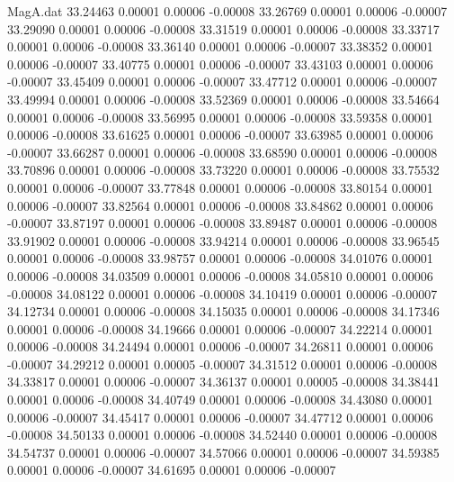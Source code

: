 \begin{filecontents}{MagA.dat}
  33.24463    0.00001    0.00006   -0.00008
  33.26769    0.00001    0.00006   -0.00007
  33.29090    0.00001    0.00006   -0.00008
  33.31519    0.00001    0.00006   -0.00008
  33.33717    0.00001    0.00006   -0.00008
  33.36140    0.00001    0.00006   -0.00007
  33.38352    0.00001    0.00006   -0.00007
  33.40775    0.00001    0.00006   -0.00007
  33.43103    0.00001    0.00006   -0.00007
  33.45409    0.00001    0.00006   -0.00007
  33.47712    0.00001    0.00006   -0.00007
  33.49994    0.00001    0.00006   -0.00008
  33.52369    0.00001    0.00006   -0.00008
  33.54664    0.00001    0.00006   -0.00008
  33.56995    0.00001    0.00006   -0.00008
  33.59358    0.00001    0.00006   -0.00008
  33.61625    0.00001    0.00006   -0.00007
  33.63985    0.00001    0.00006   -0.00007
  33.66287    0.00001    0.00006   -0.00008
  33.68590    0.00001    0.00006   -0.00008
  33.70896    0.00001    0.00006   -0.00008
  33.73220    0.00001    0.00006   -0.00008
  33.75532    0.00001    0.00006   -0.00007
  33.77848    0.00001    0.00006   -0.00008
  33.80154    0.00001    0.00006   -0.00007
  33.82564    0.00001    0.00006   -0.00008
  33.84862    0.00001    0.00006   -0.00007
  33.87197    0.00001    0.00006   -0.00008
  33.89487    0.00001    0.00006   -0.00008
  33.91902    0.00001    0.00006   -0.00008
  33.94214    0.00001    0.00006   -0.00008
  33.96545    0.00001    0.00006   -0.00008
  33.98757    0.00001    0.00006   -0.00008
  34.01076    0.00001    0.00006   -0.00008
  34.03509    0.00001    0.00006   -0.00008
  34.05810    0.00001    0.00006   -0.00008
  34.08122    0.00001    0.00006   -0.00008
  34.10419    0.00001    0.00006   -0.00007
  34.12734    0.00001    0.00006   -0.00008
  34.15035    0.00001    0.00006   -0.00008
  34.17346    0.00001    0.00006   -0.00008
  34.19666    0.00001    0.00006   -0.00007
  34.22214    0.00001    0.00006   -0.00008
  34.24494    0.00001    0.00006   -0.00007
  34.26811    0.00001    0.00006   -0.00007
  34.29212    0.00001    0.00005   -0.00007
  34.31512    0.00001    0.00006   -0.00008
  34.33817    0.00001    0.00006   -0.00007
  34.36137    0.00001    0.00005   -0.00008
  34.38441    0.00001    0.00006   -0.00008
  34.40749    0.00001    0.00006   -0.00008
  34.43080    0.00001    0.00006   -0.00007
  34.45417    0.00001    0.00006   -0.00007
  34.47712    0.00001    0.00006   -0.00008
  34.50133    0.00001    0.00006   -0.00008
  34.52440    0.00001    0.00006   -0.00008
  34.54737    0.00001    0.00006   -0.00007
  34.57066    0.00001    0.00006   -0.00007
  34.59385    0.00001    0.00006   -0.00007
  34.61695    0.00001    0.00006   -0.00007

\end{filecontents}
